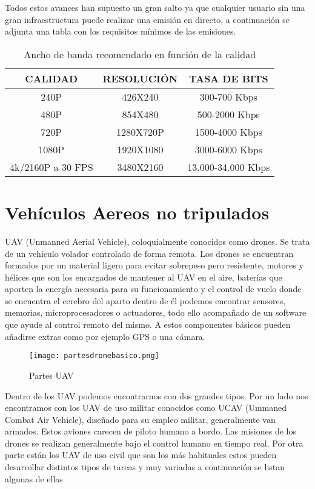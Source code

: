 Todos estos avances han supuesto un gran salto ya que cualquier usuario sin una gran infraestructura puede realizar una emisión en directo, a continuación se adjunta una tabla con los requisitos mínimos de las emisiones.


\begin{table}[H]
\centering
\begin{tabular}{|c|c c|}
\hline
 CALIDAD & RESOLUCIÓN & TASA DE BITS \\
\hline
240P & 426X240 & 300-700 Kbps \\
\hline
480P & 854X480 & 500-2000 Kbps \\
\hline
720P & 1280X720P & 1500-4000 Kbps \\
\hline
1080P & 1920X1080 & 3000-6000 Kbps \\
\hline
4k/2160P a 30 FPS & 3480X2160 & 13.000-34.000 Kbps  \\
\hline
\end{tabular}
\caption{Ancho de banda recomendado en función de la calidad}
\end{table}

\section{Vehículos Aereos no tripulados}

UAV (Unmanned Aerial Vehicle), coloquialmente conocidos como drones. Se trata de un vehículo volador controlado de forma remota. Los drones se encuentran formados por un material ligero para evitar sobrepeso pero resistente, motores y hélices que son los encargados de mantener al UAV en el aire, baterías que aporten la energía necesaria para su funcionamiento y  el control de vuelo donde se encuentra el cerebro del aparto dentro de él podemos encontrar sensores, memorias, microprocesadores o actuadores, todo ello acompañado de un software que ayude al control remoto del mismo. A estos componentes básicos pueden añadirse extras como por ejemplo GPS o una cámara.

\begin{figure}[H]
    \centering
    \texttt{[image: partesdronebasico.png]}
    \caption{Partes UAV}
\end{figure}

Dentro de los UAV podemos encontrarnos con dos grandes tipos. Por un lado nos encontramos con los UAV de uso militar conocidos como UCAV (Ummaned Combat Air Vehicle), diseñado para su empleo militar, generalmente van armados. Estos aviones carecen de piloto humano a bordo. Las misiones de los drones se realizan generalmente bajo el control humano en tiempo real. Por otra parte están los UAV de uso civil que son los más habituales estos pueden desarrollar distintos tipos de tareas y muy variadas a continuación se listan algunas de ellas


